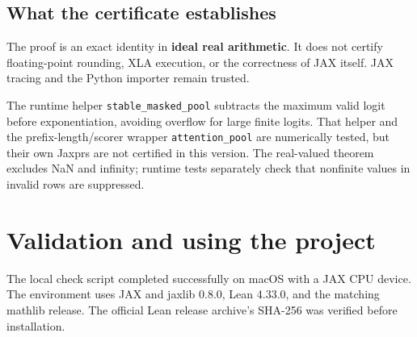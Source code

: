 \documentclass[11pt]{article}
\newcommand{\code}[1]{\nolinkurl{#1}}
\begin{document}
\subsection*{What the certificate establishes}
The proof is an exact identity in \textbf{ideal real arithmetic}. It does
not certify floating-point rounding, XLA execution, or the correctness of
JAX itself. JAX tracing and the Python importer remain trusted.

The runtime helper \code{stable_masked_pool} subtracts the maximum valid
logit before exponentiation, avoiding overflow for large finite logits.
That helper and the prefix-length/scorer wrapper \code{attention_pool}
are numerically tested, but their own Jaxprs are not certified in this version.
The real-valued theorem excludes NaN and infinity; runtime tests separately
check that nonfinite values in invalid rows are suppressed.

\newpage
\section{Validation and using the project}
The local check script completed successfully on macOS with a JAX CPU device.
The environment uses JAX and jaxlib 0.8.0, Lean 4.33.0, and the matching mathlib
release. The official Lean release archive's SHA-256 was verified before installation.
\end{document}
